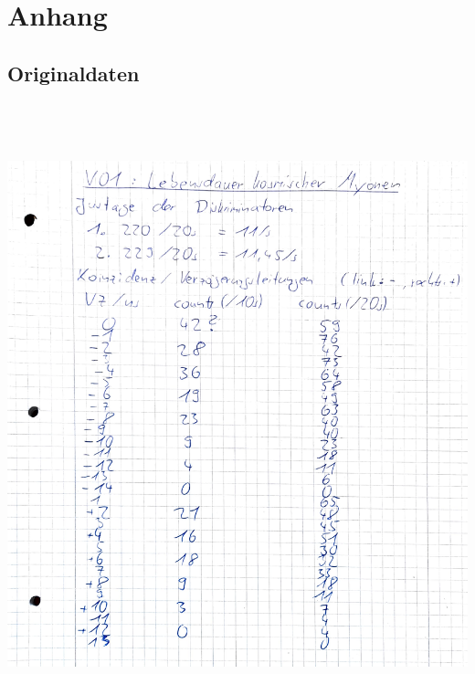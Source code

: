 \section{Anhang}
\label{sec:Anhang}
\subsection{Originaldaten}
\centering
\includegraphics[height=18cm]{content/pics/originaldaten/OriginaldatenV01.pdf}